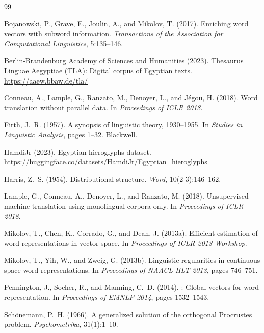 \documentclass[11pt, a4paper]{article}
\begin{document}

\begin{thebibliography}{99}

Bojanowski, P., Grave, E., Joulin, A., and Mikolov, T. (2017).
\newblock Enriching word vectors with subword information.
\newblock \textit{Transactions of the Association for Computational Linguistics}, 5:135--146.

Berlin-Brandenburg Academy of Sciences and Humanities (2023).
\newblock Thesaurus Linguae Aegyptiae (TLA): Digital corpus of Egyptian texts.
\newblock \url{https://aaew.bbaw.de/tla/}

Conneau, A., Lample, G., Ranzato, M., Denoyer, L., and J\'{e}gou, H. (2018).
\newblock Word translation without parallel data.
\newblock In \textit{Proceedings of ICLR 2018}.

Firth, J.~R. (1957).
\newblock A synopsis of linguistic theory, 1930--1955.
\newblock In \textit{Studies in Linguistic Analysis}, pages 1--32. Blackwell.

HamdiJr (2023).
\newblock Egyptian hieroglyphs dataset.
\newblock \url{https://huggingface.co/datasets/HamdiJr/Egyptian_hieroglyphs}

Harris, Z.~S. (1954).
\newblock Distributional structure.
\newblock \textit{Word}, 10(2-3):146--162.

Lample, G., Conneau, A., Denoyer, L., and Ranzato, M. (2018).
\newblock Unsupervised machine translation using monolingual corpora only.
\newblock In \textit{Proceedings of ICLR 2018}.

Mikolov, T., Chen, K., Corrado, G., and Dean, J. (2013a).
\newblock Efficient estimation of word representations in vector space.
\newblock In \textit{Proceedings of ICLR 2013 Workshop}.

Mikolov, T., Yih, W., and Zweig, G. (2013b).
\newblock Linguistic regularities in continuous space word representations.
\newblock In \textit{Proceedings of NAACL-HLT 2013}, pages 746--751.

Pennington, J., Socher, R., and Manning, C.~D. (2014).
: Global vectors for word representation.
\newblock In \textit{Proceedings of EMNLP 2014}, pages 1532--1543.

Sch\"{o}nemann, P.~H. (1966).
\newblock A generalized solution of the orthogonal {P}rocrustes problem.
\newblock \textit{Psychometrika}, 31(1):1--10.

\end{thebibliography}
\end{document}
